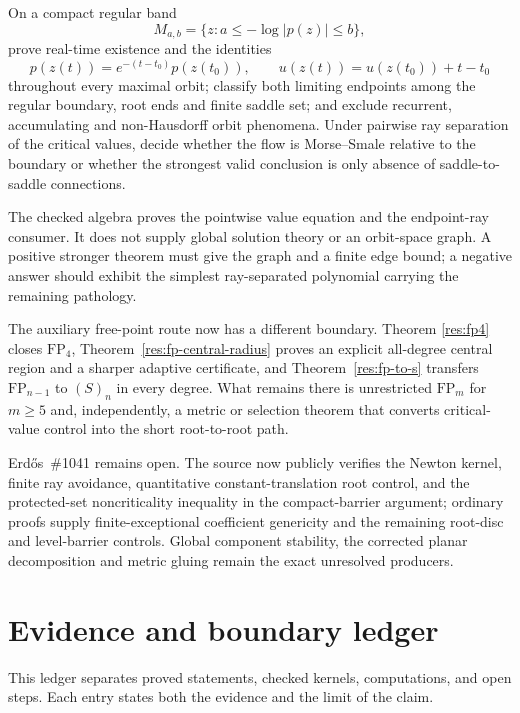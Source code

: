\documentclass[11pt]{article}
\begin{document}
\begin{problem}\label{prob:globalflow1041}
On a compact regular band
\[
 M_{a,b}=\{z:a\le-\log|p(z)|\le b\},
\]
prove real-time existence and the identities
\[
 p(z(t))=e^{-(t-t_0)}p(z(t_0)),\qquad
 u(z(t))=u(z(t_0))+t-t_0
\]
throughout every maximal orbit; classify both limiting endpoints among the
regular boundary, root ends and finite saddle set; and exclude recurrent,
accumulating and non-Hausdorff orbit phenomena.  Under pairwise ray separation
of the critical values, decide whether the flow is Morse--Smale relative to the
boundary or whether the strongest valid conclusion is only absence of
saddle-to-saddle connections.
\end{problem}

The checked algebra proves the pointwise value equation and the endpoint-ray
consumer.  It does not supply global solution theory or an orbit-space graph.
A positive stronger theorem must give the graph and a finite edge bound; a
negative answer should exhibit the simplest ray-separated polynomial carrying
the remaining pathology.

The auxiliary free-point route now has a different boundary.  Theorem
\ref{res:fp4} closes $\mathrm{FP}_4$,
Theorem~\ref{res:fp-central-radius} proves an explicit all-degree central
region and a sharper adaptive certificate, and
Theorem~\ref{res:fp-to-s} transfers $\mathrm{FP}_{n-1}$ to $(S)_n$ in every
degree.  What remains there is unrestricted $\mathrm{FP}_m$ for $m\ge5$ and,
independently, a metric or selection theorem that converts critical-value
control into the short root-to-root path.

Erd\H{o}s~\#1041 remains open.  The source now publicly verifies the Newton
kernel, finite ray avoidance, quantitative constant-translation root control,
and the protected-set noncriticality inequality in the compact-barrier
argument; ordinary proofs supply finite-exceptional coefficient genericity and
the remaining root-disc and level-barrier controls.  Global component
stability, the corrected planar decomposition and metric gluing remain the
exact unresolved producers.

\section{Evidence and boundary ledger}
\label{sec:evidence-ledger}

This ledger separates proved statements, checked kernels, computations, and
open steps.  Each entry states both the evidence and the limit of the claim.
\end{document}
